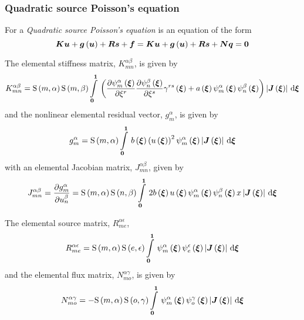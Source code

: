 \subsubsection{Quadratic source Poisson's equation}

For a \emph{Quadratic source Poisson's equation}
 is an equation of the form
\begin{equation}
  \matr{K}\vect{u}+\fnof{\vect{g}}{\vect{u}}+\matr{R}\vect{s}+\vect{f}=\matr{K}\vect{u}+\fnof{\vect{g}}{\vect{u}}+\matr{R}\vect{s}+\matr{N}\vect{q}=\vect{0}
\end{equation}

The elemental stiffness matrix, $K^{\alpha\beta}_{mn}$, is given by
\begin{equation}
  K^{\alpha\beta}_{mn}=\gsf{m}{\alpha}\gsf{m}{\beta}
  \gint{\vectr{0}}{\vectr{1}}{\pbrac{\delby{\gbfn{m}{\alpha}{\vectr{\xi}}}{\xi^{r}}
      \delby{\gbfn{n}{\beta}{\vectr{\xi}}}{\xi^{s}}\fnof{\gamma^{rs}}{\vectr{\xi}}+
      \fnof{a}{\vectr{\xi}}\gbfn{m}{\alpha}{\vectr{\xi}}\gbfn{n}{\beta}{\vectr{\xi}}}
    \abs{\fnof{\matr{J}}{\vectr{\xi}}}}{\vectr{\xi}}
  \label{eqn:elementalfemlhs2}
\end{equation}
and the nonlinear elemental residual vector, $g^{\alpha}_{m}$, is given by 
\begin{equation}
  g^{\alpha}_{m}=\gsf{m}{\alpha}\gint{\vectr{0}}{\vectr{1}}{\fnof{b}{\vectr{\xi}}
    \pbrac{\fnof{u}{\vectr{\xi}}}^{2}\gbfn{m}{\alpha}{\vectr{\xi}}\abs{\fnof{\matr{J}}{\vectr{\xi}}}}{\vectr{\xi}}
\end{equation}
with an elemental Jacobian matrix, $J^{\alpha\beta}_{mn}$, given by
\begin{equation}
  J^{\alpha\beta}_{mn}=\delby{g^{\alpha}_{m}}{u^{\beta}_{n}}=\gsf{m}{\alpha}\gsf{n}{\beta}\gint{\vectr{0}}{\vectr{1}}{
    2\fnof{b}{\vectr{\xi}}\fnof{u}{\vectr{\xi}}\gbfn{m}{\alpha}{\vectr{\xi}}\gbfn{n}{\beta}{\vectr{\xi}}
    x\abs{\fnof{\matr{J}}{\vectr{\xi}}}}{\vectr{\xi}}
\end{equation}

The elemental source matrix, $R^{\alpha\epsilon}_{me}$, 
\begin{equation}
  R^{\alpha\epsilon}_{me}=\gsf{m}{\alpha}\gsf{e}{\epsilon}
  \gint{\vectr{0}}{\vectr{1}}{\gbfn{m}{\alpha}{\vectr{\xi}}\gbfn{e}{\epsilon}{\vectr{\xi}}
    \abs{\fnof{\matr{J}}{\vectr{\xi}}}}{\vectr{\xi}}
\end{equation}
and the elemental flux matrix, $N^{\alpha\gamma}_{mo}$, is given by
\begin{equation}
  N^{\alpha\gamma}_{mo} =-\gsf{m}{\alpha}\gsf{o}{\gamma}
  \gint{\vectr{0}}{\vectr{1}}{\gbfn{m}{\alpha}{\vectr{\xi}}\gbfn{o}{\gamma}{\vectr{\xi}}
    \abs{\fnof{\matr{J}}{\vectr{\xi}}}}{\vectr{\xi}}
\end{equation}

